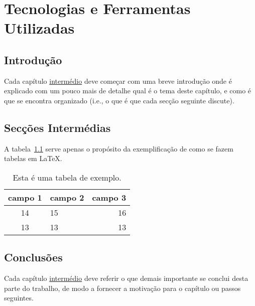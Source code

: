 \chapter{Tecnologias e Ferramentas Utilizadas}
\label{chap:tecno-ferra}

\section{Introdução}
\label{chap3:sec:intro}
Cada capítulo \underline{intermédio} deve começar com uma breve introdução onde é explicado com um pouco mais de detalhe qual é o tema deste capítulo, e como é que se encontra organizado (i.e., o que é que cada secção seguinte discute).

\section{Secções Intermédias}
\label{chap3:sec:...}

A tabela~\ref{tab:exemplo} serve apenas o propósito da exemplificação de como se fazem tabelas em \LaTeX.
%
\begin{table}
\centering
\begin{tabular}{|c|lr|}
\hline
\textbf{campo 1} & \textbf{campo 2} & \textbf{campo 3}\\
\hline
\hline
14 & 15 & 16 \\
\hline	
13 & 13 & 13 \\
\hline
\end{tabular}
\caption{Esta é uma tabela de exemplo.}
\label{tab:exemplo}
\end{table}

\section{Conclusões}
\label{chap3:sec:concs}
Cada capítulo \underline{intermédio} deve referir o que demais importante se conclui desta parte do trabalho, de modo a fornecer a motivação para o capítulo ou passos seguintes.